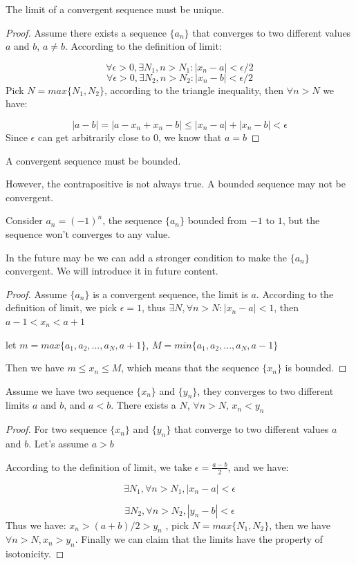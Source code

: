 \documentclass[oneside]{book}
\begin{document}
\begin{theorem}
The limit of a convergent sequence must be unique.
\end{theorem}
\begin{proof}
Assume there exists a sequence $\{a_n\}$ that converges to two different values $a$ and $b$, $a\neq b$. According to the definition of limit:

\[
\forall\epsilon>0, \exists N_1, n>N_1:|x_n - a|< \epsilon/2
\]
\[
\forall\epsilon>0, \exists N_2, n>N_2:|x_n - b|< \epsilon/2
\]
Pick $N=max\{N_1,N_2\}$, according to the triangle inequality, then $\forall n>N$ we have:

\[
|a-b| = |a-x_n+x_n-b| \leq |x_n-a|+|x_n-b|<\epsilon
\]
Since $\epsilon$ can get arbitrarily close to $0$, we know that $a=b$ 
\end{proof}

\begin{theorem}
A convergent sequence must be bounded.
\end{theorem}
\begin{remark}
However, the contrapositive is not always true. A bounded sequence may not be convergent.

Consider $a_n = (-1)^n$, the sequence $\{a_n\}$ bounded from $-1$ to $1$, but the sequence won't converges to any value.

In the future may be we can add a stronger condition to make the $\{a_n\}$ convergent. We will introduce it in future content.
\end{remark}

\begin{proof}
Assume $\{a_n\}$ is a convergent sequence, the limit is $a$. According to the definition of limit, we pick $\epsilon = 1$, thus $\exists N, \forall n > N:|x_n-a|<1$, then $a-1<x_n<a+1$

let $m = max\{a_1, a_2, ..., a_N, a+1\}$, $M = min\{a_1, a_2, ..., a_N, a-1\}$

Then we have $m \leq x_n \leq M$, which means that the sequence $\{x_n\}$ is bounded.
\end{proof}

\begin{theorem}[isotonicity]
Assume we have two sequence $\{x_n\}$ and $\{y_n\}$, they converges to two different limits $a$ and $b$, and $a<b$. There exists a $N$, $\forall n>N$, $x_n<y_n$
\end{theorem}

\begin{proof}
For two sequence $\{x_n\}$ and $\{y_n\}$ that converge to two different values $a$ and $b$. Let's assume $a>b$

According to the definition of limit, we take $\epsilon = \frac{a-b}{2}$, and we have:

\[
\exists N_1, \forall n>N_1, |x_n-a| < \epsilon
\]

\[
\exists N_2, \forall n>N_2, |y_n-b| < \epsilon
\]
Thus we have: $x_n > (a+b)/2 >y_n$ , pick $N = max \{N_1,N_2\}$, then we have $\forall n > N, x_n>y_n$. Finally we can claim that the limits have the property of isotonicity.
\end{proof}
\end{document}
